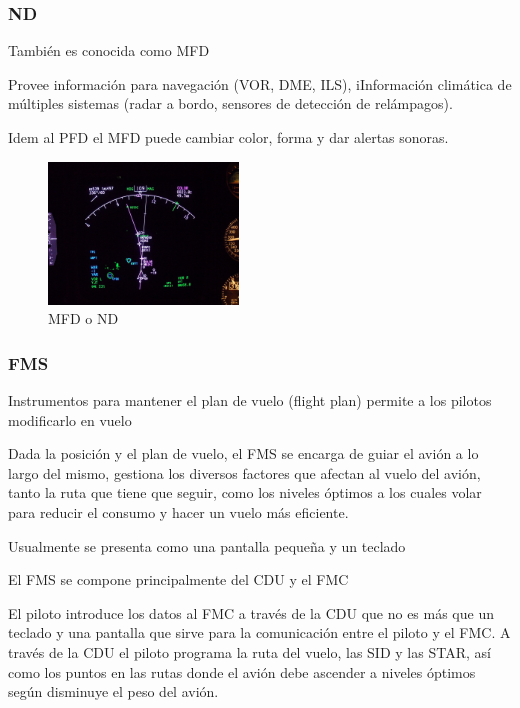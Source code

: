 \subsubsection{\ac{ND}}
\label{sec:01.nd}

Tambi\'en es conocida como \ac{MFD}

    Provee informaci\'on para navegaci\'on (VOR, DME, ILS), iInformaci\'on clim\'atica de m\'ultiples sistemas (radar a bordo, sensores de detecci\'on de rel\'ampagos).

    Idem al PFD el MFD puede cambiar color, forma y dar alertas  sonoras.

    \begin{figure}[!htb]\centering
      
      \includegraphics[width=0.45\textwidth]{01.tablero.instrumentos/U01.imagenes/1.4.pantalla.electronica/Navigation_Display_(ND)_on_Boeing_747-400.jpg}
      
      \caption{MFD o ND}
  \label{fig:01.MFD}
\end{figure}

\subsubsection{\ac{FMS}}
\label{sec:01.FMS}

   Instrumentos para mantener el plan de vuelo (flight plan) permite
    a los pilotos modificarlo en vuelo

    Dada la posici\'on y el plan de vuelo, el  \ac{FMS} se encarga de guiar
    el avi\'on a lo largo del mismo, gestiona los diversos factores
    que afectan al vuelo del avi\'on, tanto la ruta que tiene que
    seguir, como los niveles \'optimos a los cuales volar para reducir
    el consumo y hacer un vuelo m\'as eficiente.


    Usualmente se presenta como una pantalla peque\~na y un teclado

    El \ac{FMS} se compone principalmente del \ac{CDU} y 
    el \ac{FMC}
 
El piloto introduce los datos al \ac{FMC} a trav\'es de la \ac{CDU} que no es m\'as que un teclado 
y una pantalla que sirve para la comunicaci\'on entre el piloto y el \ac{FMC}. 
A trav\'es de la \ac{CDU} el piloto programa la ruta del vuelo, las \ac{SID}  
y las \ac{STAR}, as\'i como los puntos en las rutas donde el avi\'on debe ascender 
a niveles \'optimos seg\'un disminuye el peso del avi\'on.

